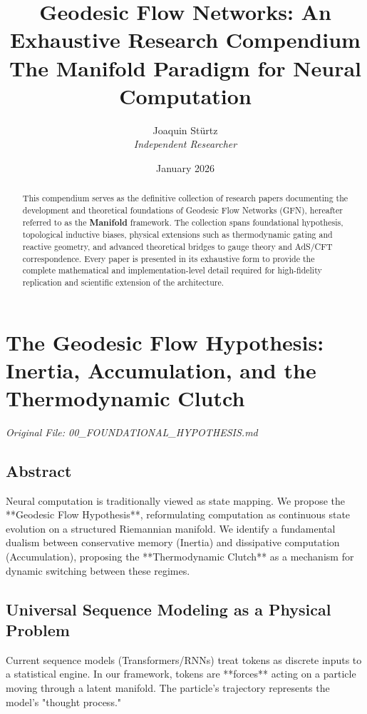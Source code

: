 \documentclass[11pt,a4paper]{report}
\title{\textbf{Geodesic Flow Networks: An Exhaustive Research Compendium}\\ \Large The Manifold Paradigm for Neural Computation}
\author{Joaquin Stürtz \\ \textit{Independent Researcher}}
\date{January 2026}
\begin{document}
\maketitle

\begin{abstract}
This compendium serves as the definitive collection of research papers documenting the development and theoretical foundations of Geodesic Flow Networks (GFN), hereafter referred to as the \textbf{Manifold} framework. The collection spans foundational hypothesis, topological inductive biases, physical extensions such as thermodynamic gating and reactive geometry, and advanced theoretical bridges to gauge theory and AdS/CFT correspondence. Every paper is presented in its exhaustive form to provide the complete mathematical and implementation-level detail required for high-fidelity replication and scientific extension of the architecture.
\end{abstract}

\tableofcontents

\chapter{The Geodesic Flow Hypothesis: Inertia, Accumulation, and the Thermodynamic Clutch}
\textit{Original File: 00\_FOUNDATIONAL\_HYPOTHESIS.md}

\section{Abstract}
Neural computation is traditionally viewed as state mapping. We propose the **Geodesic Flow Hypothesis**, reformulating computation as continuous state evolution on a structured Riemannian manifold. We identify a fundamental dualism between conservative memory (Inertia) and dissipative computation (Accumulation), proposing the **Thermodynamic Clutch** as a mechanism for dynamic switching between these regimes.

\section{Universal Sequence Modeling as a Physical Problem}
Current sequence models (Transformers/RNNs) treat tokens as discrete inputs to a statistical engine. In our framework, tokens are **forces** acting on a particle moving through a latent manifold. The particle's trajectory represents the model's "thought process."
\end{document}
